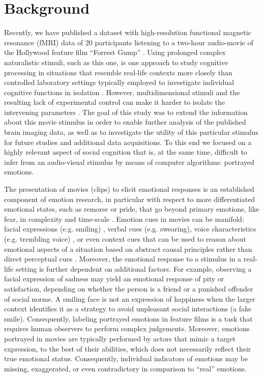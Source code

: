 \documentclass[10pt,a4paper,twocolumn]{article}
\begin{document}
\section*{Background} 


Recently, we have published a dataset with high-resolution functional magnetic
resonance (fMRI) data of 20 participants listening to a two-hour audio-movie of
the Hollywood feature film ``Forrest Gump'' \cite{HBI+14}. Using prolonged
complex naturalistic stimuli, such as this one, is one approach to study
cognitive processing in situations that resemble real-life contexts more
closely than controlled laboratory settings typically employed to investigate
individual cognitive functions in isolation \cite{HH2012}. However,
multidimensional stimuli and the resulting lack of experimental control can
make it harder to isolate the intervening parameters \cite{HH2012}.  The goal
of this study was to extend the information about this movie stimulus in order
to enable further analysis of the published brain imaging data, as well as to
investigate the utility of this particular stimulus for future studies and
additional data acquisitions. To this end we focused on a highly relevant
aspect of social cognition that is, at the same time, difficult to infer from
an audio-visual stimulus by means of computer algorithms: portrayed emotions.

The presentation of movies (clips) to elicit emotional responses is an
established component of emotion research, in particular with respect to more
differentiated emotional states, such as remorse or pride, that go beyond
primary emotions, like fear, in complexity and time-scale \cite{GL1995}.
Emotion cues in movies can be manifold: facial expressions (e.g.  smiling)
\cite{Ekm1992b}, verbal cues (e.g. swearing), voice characteristics (e.g.
trembling voice) \cite{EVS+2009}, or even context cues that can be used to
reason about emotional aspects of a situation based on abstract causal
principles rather than direct perceptual cues \cite{SS2014}.  Moreover, the
emotional response to a stimulus in a real-life setting is further dependent on
additional factors. For example, observing a facial expression of sadness may
yield an emotional response of pity or satisfaction, depending on whether the
person is a friend or a punished offender of social norms. A smiling face is
not an expression of happiness when the larger context identifies it as a
strategy to avoid unpleasant social interactions (a fake smile).  Consequently,
labeling portrayed emotions in feature films is a task that requires human
observers to perform complex judgements. Moreover, emotions portrayed in movies
are typically performed by actors that mimic a target expression, to the best
of their abilities, which does not necessarily reflect their true emotional
status.  Consequently, individual indicators of emotions may be missing,
exaggerated, or even contradictory in comparison to ``real'' emotions.
\end{document}
